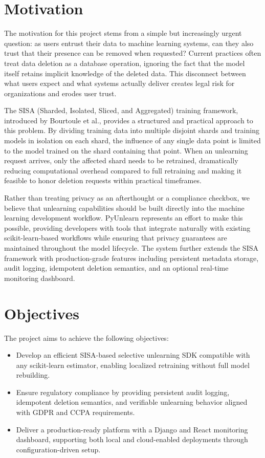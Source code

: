 \section{Motivation}
The motivation for this project stems from a simple but increasingly urgent question: as users entrust their data to machine learning systems, can they also trust that their presence can be removed when requested? Current practices often treat data deletion as a database operation, ignoring the fact that the model itself retains implicit knowledge of the deleted data. This disconnect between what users expect and what systems actually deliver creates legal risk for organizations and erodes user trust.

The SISA (Sharded, Isolated, Sliced, and Aggregated) training framework, introduced by Bourtoule et al., provides a structured and practical approach to this problem. By dividing training data into multiple disjoint shards and training models in isolation on each shard, the influence of any single data point is limited to the model trained on the shard containing that point. When an unlearning request arrives, only the affected shard needs to be retrained, dramatically reducing computational overhead compared to full retraining and making it feasible to honor deletion requests within practical timeframes.

Rather than treating privacy as an afterthought or a compliance checkbox, we believe that unlearning capabilities should be built directly into the machine learning development workflow. PyUnlearn represents an effort to make this possible, providing developers with tools that integrate naturally with existing scikit-learn-based workflows while ensuring that privacy guarantees are maintained throughout the model lifecycle. The system further extends the SISA framework with production-grade features including persistent metadata storage, audit logging, idempotent deletion semantics, and an optional real-time monitoring dashboard.

\section{Objectives}
The project aims to achieve the following objectives:
\begin{itemize}
\item Develop an efficient SISA-based selective unlearning SDK compatible with any scikit-learn estimator, enabling localized retraining without full model rebuilding.
\item Ensure regulatory compliance by providing persistent audit logging, idempotent deletion semantics, and verifiable unlearning behavior aligned with GDPR and CCPA requirements.
\item Deliver a production-ready platform with a Django and React monitoring dashboard, supporting both local and cloud-enabled deployments through configuration-driven setup.
\end{itemize}

